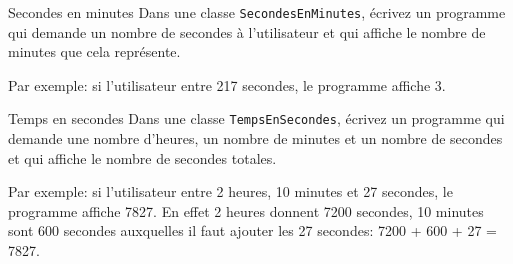 \documentclass[a4paper,11pt]{article}
\begin{document}
%		
%		
	
	
	\begin{Exercice}{Secondes en minutes} 
		Dans une classe \texttt{SecondesEnMinutes}, écrivez un programme qui demande 
		un nombre de secondes à l'utilisateur
		et qui affiche le nombre de minutes que cela représente.

		Par exemple: 
		si l'utilisateur entre 217 secondes, le programme affiche 3. 
	\end{Exercice}

	\begin{Exercice}{Temps en secondes} 
		Dans une classe \texttt{TempsEnSecondes}, écrivez un programme qui demande 
		une nombre d'heures, un nombre de minutes et un nombre de secondes
		et qui affiche le nombre de secondes totales.
		
		Par exemple: si l'utilisateur entre 2 heures, 10 minutes et 27 secondes, le programme affiche
		7827. En effet 2 heures donnent 7200 secondes, 10 minutes sont 600 secondes 
		auxquelles il faut ajouter les 27 secondes: 7200 + 600 + 27 = 7827. 
	\end{Exercice}

\end{document}
